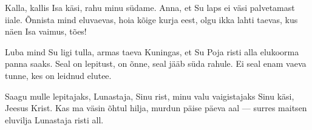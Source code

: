 Kalla, kallis Isa k\"asi,
rahu minu s\"udame.
Anna, et Su laps ei v\"asi
palvetamast iiale.
\~Onnista mind eluvaevas,
hoia k\~oige kurja eest,
olgu ikka lahti taevas,
kus n\"aen Isa vaimus, t\~oes!

Luba mind Su ligi tulla,
armas taeva Kuningas,
et Su Poja risti alla
elukoorma panna saaks.
Seal on lepitust, on \~onne,
seal j\"a\"ab s\"uda rahule.
Ei seal enam vaeva tunne,
kes on leidnud elutee.

Saagu mulle lepitajaks,
Lunastaja, Sinu rist,
minu valu vaigistajaks
Sinu k\"asi, Jeesus Krist.
Kas ma v\"asin \~ohtul hilja,
murdun p\"aise p\"aeva aal ---
surres maitsen eluvilja
Lunastaja risti all.
